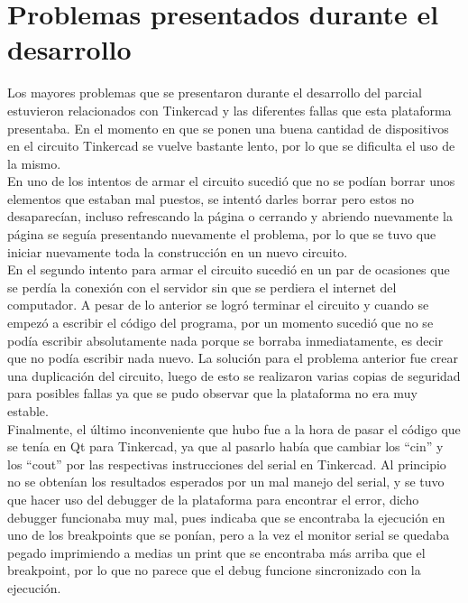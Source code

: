 \documentclass{article}
\begin{document}
\section{Problemas presentados durante el desarrollo} \label{problems}
Los mayores problemas que se presentaron durante el desarrollo del parcial estuvieron relacionados con Tinkercad y las diferentes fallas que esta plataforma presentaba. En el momento en que se ponen una buena cantidad de dispositivos en el circuito Tinkercad se vuelve bastante lento, por lo que se dificulta el uso de la mismo.\\
En uno de los intentos de armar el circuito sucedió que no se podían borrar unos elementos que estaban mal puestos, se intentó darles borrar pero estos no desaparecían, incluso refrescando la página o cerrando y abriendo nuevamente la página se seguía presentando nuevamente el problema, por lo que se tuvo que iniciar nuevamente toda la construcción en un nuevo circuito.\\
En el segundo intento para armar el circuito sucedió en un par de ocasiones que se perdía la conexión con el servidor sin que se perdiera el internet del computador. A pesar de lo anterior se logró terminar el circuito y cuando se empezó a escribir el código del programa, por un momento sucedió que no se podía escribir absolutamente nada porque se borraba inmediatamente, es decir que no podía escribir nada nuevo. La solución para el problema anterior fue crear una duplicación del circuito, luego de esto se realizaron varias copias de seguridad para posibles fallas ya que se pudo observar que la plataforma no era muy estable.\\
Finalmente, el último inconveniente que hubo fue a la hora de pasar el código que se tenía en Qt para Tinkercad, ya que al pasarlo había que cambiar los “cin” y los “cout” por las respectivas instrucciones del serial en Tinkercad. Al principio no se obtenían los resultados esperados por un mal manejo del serial, y se tuvo que hacer uso del debugger de la plataforma para encontrar el error, dicho debugger funcionaba muy mal, pues indicaba que se encontraba la ejecución en uno de los breakpoints que se ponían, pero a la vez el monitor serial se quedaba pegado imprimiendo a medias un print que se encontraba más arriba que el breakpoint, por lo que no parece que el debug funcione sincronizado con la ejecución.\\\\
\end{document}
